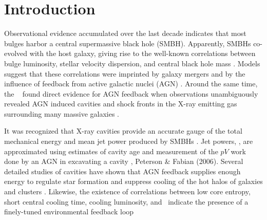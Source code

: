 \documentclass{emulateapj}
\begin{document}


\section{Introduction}
\label{sec:intro}

Observational evidence accumulated over the last decade indicates that
most bulges harbor a central supermassive black hole (SMBH).  Apparently,
SMBHs co-evolved with the host galaxy, giving rise to the well-known
correlations between bulge luminosity, stellar velocity dispersion,
and central black hole mass \citep{1995ARA&A..33..581K, magorrian,
  2000ApJ...539L...9F, 2000ApJ...539L..13G, marconihunt03,
  2005MNRAS.362...25B}.  Models suggest that these 
correlations were imprinted by galaxy mergers and by the influence
of feedback from active galactic nuclei (AGN)
\citep[\eg][]{1998A&A...331L...1S, 2000MNRAS.311..576K}. Around the
same time, the \cxo\ \citep{chandra} found direct evidence for AGN
feedback when observations unambiguously revealed AGN induced cavities
and shock fronts in the X-ray emitting gas surrounding many massive
galaxies \citep[\eg][]{2000ApJ...534L.135M, perseus1, schindler01}.

It was recognized that X-ray cavities provide an accurate gauge of the
total mechanical energy and mean jet power produced by SMBHs
\citep{2000ApJ...534L.135M}. Jet powers, \pjet, are approximated using
estimates of cavity age and measurement of the $pV$ work done by an
AGN in excavating a cavity \citep[see][for a reviews]{mcnamrev},
Peterson \& Fabian (2006). Several detailed studies of cavities have
shown that AGN feedback supplies enough energy to regulate star
formation and suppress cooling of the hot halos of galaxies and
clusters \citep{birzan04, 2005MNRAS.364.1343D, rafferty06, dunn08,
  birzan08, 2008ApJ...680..897D}. Likewise, the existence of
correlations between low core entropy, short central cooling time,
cooling luminosity, and \pjet\ indicate the presence of a finely-tuned
environmental feedback loop \citep{haradent, 2008ApJ...687..899R,
  accept, 2009A&A...501..835M, 2009MNRAS.395..764S}
\end{document}
